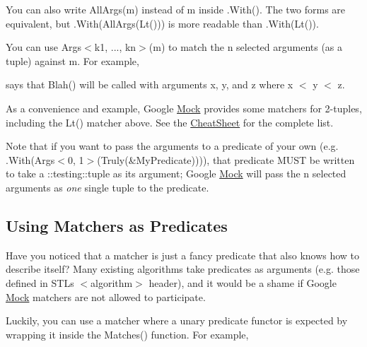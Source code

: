 You can also write {\ttfamily All\+Args(m)} instead of {\ttfamily m} inside {\ttfamily .With()}. The two forms are equivalent, but {\ttfamily .With(All\+Args(\+Lt()))} is more readable than {\ttfamily .With(\+Lt())}.

You can use {\ttfamily Args$<$k1, ..., kn$>$(m)} to match the {\ttfamily n} selected arguments (as a tuple) against {\ttfamily m}. For example,


\begin{DoxyCode}{0}
\end{DoxyCode}


says that {\ttfamily Blah()} will be called with arguments {\ttfamily x}, {\ttfamily y}, and {\ttfamily z} where {\ttfamily x $<$ y $<$ z}.

As a convenience and example, Google \mbox{\hyperlink{class_mock}{Mock}} provides some matchers for 2-\/tuples, including the {\ttfamily Lt()} matcher above. See the \mbox{\hyperlink{_obj__test_2lib_2googletest-release-1_88_81_2googlemock_2docs_2_cheat_sheet_8md}{Cheat\+Sheet}} for the complete list.

Note that if you want to pass the arguments to a predicate of your own (e.\+g. {\ttfamily .With(Args$<$0, 1$>$(Truly(\&\+My\+Predicate)))}), that predicate M\+U\+ST be written to take a {\ttfamily \+::testing\+::tuple} as its argument; Google \mbox{\hyperlink{class_mock}{Mock}} will pass the {\ttfamily n} selected arguments as {\itshape one} single tuple to the predicate.

\subsection*{Using Matchers as Predicates}

Have you noticed that a matcher is just a fancy predicate that also knows how to describe itself? Many existing algorithms take predicates as arguments (e.\+g. those defined in S\+TL\textquotesingle{}s {\ttfamily $<$algorithm$>$} header), and it would be a shame if Google \mbox{\hyperlink{class_mock}{Mock}} matchers are not allowed to participate.

Luckily, you can use a matcher where a unary predicate functor is expected by wrapping it inside the {\ttfamily Matches()} function. For example,


